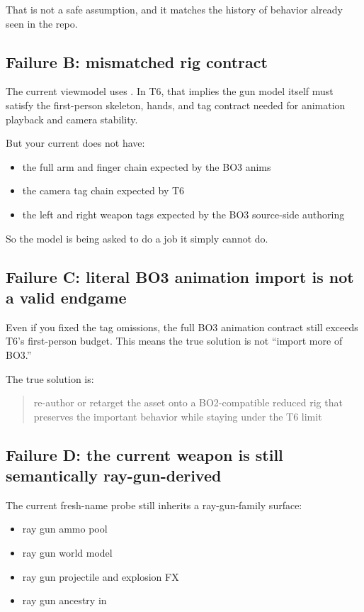 \documentclass[11pt]{article}
\begin{document}
That is not a safe assumption, and it matches the history of  behavior already seen in the repo.

\subsection{Failure B: mismatched rig contract}

The current viewmodel uses . In T6, that implies the gun model itself must satisfy the first-person skeleton, hands, and tag contract needed for animation playback and camera stability.

But your current  does not have:

\begin{itemize}
  \item the full arm and finger chain expected by the BO3 anims
  \item the camera tag chain expected by T6
  \item the left and right weapon tags expected by the BO3 source-side authoring
\end{itemize}

So the model is being asked to do a job it simply cannot do.

\subsection{Failure C: literal BO3 animation import is not a valid endgame}

Even if you fixed the tag omissions, the full BO3 animation contract still exceeds T6's first-person budget. This means the true solution is not ``import more of BO3.''

The true solution is:

\begin{quote}
re-author or retarget the asset onto a BO2-compatible reduced rig that preserves the important behavior while staying under the T6 limit
\end{quote}

\subsection{Failure D: the current weapon is still semantically ray-gun-derived}

The current fresh-name probe still inherits a ray-gun-family surface:

\begin{itemize}
  \item ray gun ammo pool
  \item ray gun world model
  \item ray gun projectile and explosion FX
  \item ray gun ancestry in 
\end{itemize}
\end{document}
